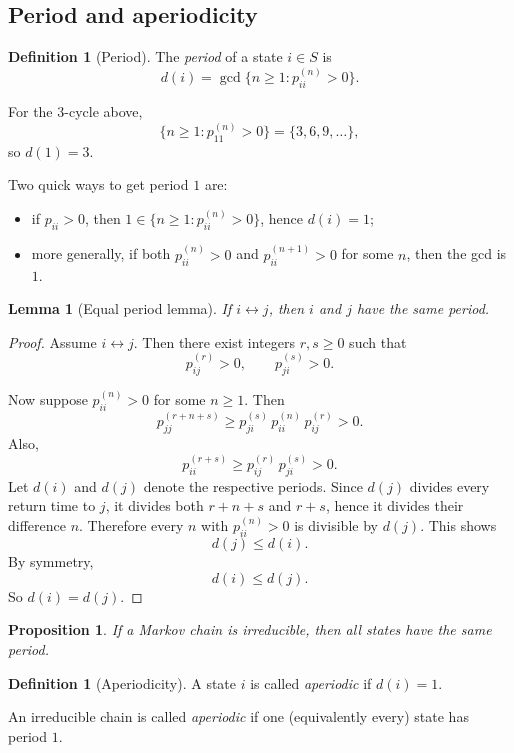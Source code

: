 \documentclass[11pt]{article}
\newtheorem{proposition}[theorem]{Proposition}
\newtheorem{lemma}[theorem]{Lemma}
\theoremstyle{definition}
\newtheorem{definition}[theorem]{Definition}
\begin{document}
\subsection{Period and aperiodicity}

\begin{definition}[Period]
The \emph{period} of a state \(i\in S\) is
\[
d(i)=\gcd\{n\ge 1: p_{ii}^{(n)}>0\}.
\]
\end{definition}

For the \(3\)-cycle above,
\[
\{n\ge 1:p_{11}^{(n)}>0\}=\{3,6,9,\dots\},
\]
so \(d(1)=3\).

Two quick ways to get period \(1\) are:
\begin{itemize}[leftmargin=2em]
    \item if \(p_{ii}>0\), then \(1\in \{n\ge 1:p_{ii}^{(n)}>0\}\), hence \(d(i)=1\);
    \item more generally, if both \(p_{ii}^{(n)}>0\) and \(p_{ii}^{(n+1)}>0\) for some \(n\), then the gcd is \(1\).
\end{itemize}

\begin{lemma}[Equal period lemma]
If \(i\leftrightarrow j\), then \(i\) and \(j\) have the same period.
\end{lemma}

\begin{proof}
Assume \(i\leftrightarrow j\). Then there exist integers \(r,s\ge 0\) such that
\[
p_{ij}^{(r)}>0,
\qquad
p_{ji}^{(s)}>0.
\]

Now suppose \(p_{ii}^{(n)}>0\) for some \(n\ge 1\). Then
\[
p_{jj}^{(r+n+s)}
\ge
p_{ji}^{(s)}\,p_{ii}^{(n)}\,p_{ij}^{(r)}
>
0.
\]
Also,
\[
p_{ii}^{(r+s)}
\ge
p_{ij}^{(r)}\,p_{ji}^{(s)}
>
0.
\]
Let \(d(i)\) and \(d(j)\) denote the respective periods. Since \(d(j)\) divides every return time to \(j\), it divides both \(r+n+s\) and \(r+s\), hence it divides their difference \(n\). Therefore every \(n\) with \(p_{ii}^{(n)}>0\) is divisible by \(d(j)\). This shows
\[
d(j)\le d(i).
\]
By symmetry,
\[
d(i)\le d(j).
\]
So \(d(i)=d(j)\).
\end{proof}

\begin{proposition}
If a Markov chain is irreducible, then all states have the same period.
\end{proposition}

\begin{definition}[Aperiodicity]
A state \(i\) is called \emph{aperiodic} if \(d(i)=1\).

An irreducible chain is called \emph{aperiodic} if one (equivalently every) state has period \(1\).
\end{definition}
\end{document}

